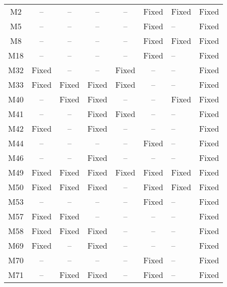 \begin{table}[!t]
{\begin{tabular}{|c|c|c|c|c|c|}
\hline
M2                & --        & --        & --        & --        & Fixed     & Fixed     &Fixed   \\
M5                & --        & --        & --        & --        & Fixed     & --        &Fixed   \\
M8                & --        & --        & --        & --        & Fixed     & Fixed     &Fixed   \\
M18               & --        & --        & --        & --        & Fixed     & --        &Fixed   \\
M32               & Fixed     & --        & --        & Fixed     & --        & --        &Fixed   \\
M33               & Fixed     & Fixed     & Fixed     & Fixed     & --        & --        &Fixed   \\
M40               & --        & Fixed     & Fixed     & --        & --        & Fixed     &Fixed   \\
M41               & --        & --        & Fixed     & Fixed     & --        & --        &Fixed   \\
M42               & Fixed     & --        & Fixed     & --        & --        & --        &Fixed   \\
M44               & --        & --        & --        & --        & Fixed     & --        &Fixed   \\
M46               & --        & --        & Fixed     & --        & --        & --        &Fixed   \\
M49               & Fixed     & Fixed     & Fixed     & Fixed     & Fixed     & Fixed     &Fixed   \\
M50               & Fixed     & Fixed     & Fixed     & --        & Fixed     & Fixed     &Fixed   \\
M53               & --        & --        & --        & --        & Fixed     & --        &Fixed   \\
M57               & Fixed     & Fixed     & --        & --        & --        & --        &Fixed   \\
M58               & Fixed     & Fixed     & Fixed     & --        & --        & --        &Fixed   \\
M69               & Fixed     & --        & Fixed     & --        & --        & --        &Fixed   \\
M70               & --        & --        & --        & --        & Fixed     & --        &Fixed   \\
M71               & --        & Fixed     & Fixed     & --        & Fixed     & --        &Fixed   \\

\end{tabular}}
\end{table}
